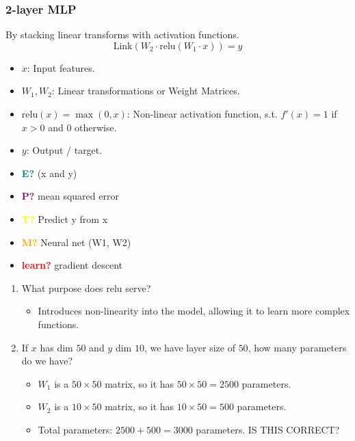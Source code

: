 \documentclass{article}
\begin{document}
\subsubsection{2-layer MLP}
\begin{definition} By stacking linear transforms with activation functions.
    \begin{equation}
        \text{Link}(W_2 \cdot \text{relu}(W_1 \cdot x)) = y
    \end{equation}
    \begin{itemize}
        \item $x$: Input features.
        \item $W_1, W_2$: Linear transformations or Weight Matrices.
        \item $\text{relu}(x) = \max(0,x)$: Non-linear activation function, s.t. $f'(x) = 1$ if $x > 0$ and $0$ otherwise.
        \item $y$: Output / target. 
    \end{itemize}
    \vspace{1em}

    \begin{itemize}
        \item \textcolor{teal}{\textbf{E?}} (x and y)
        \item \textcolor{purple}{\textbf{P?}} mean squared error
        \item \textcolor{yellow}{\textbf{T?}} Predict y from x
        \item \textcolor{orange}{\textbf{M?}} Neural net (W1, W2)
        \item \textcolor{red}{\textbf{learn?}} gradient descent
    \end{itemize}
\end{definition}

\begin{example}
    \begin{enumerate}
        \item What purpose does relu serve? 
            \begin{itemize}
                \item Introduces non-linearity into the model, allowing it to learn more complex functions.
            \end{itemize}       
        \item If $x$ has dim $50$ and $y$ dim $10$, we have layer size of $50$, how many parameters do we have?
            \begin{itemize}
                \item $W_1$ is a $50 \times 50$ matrix, so it has $50 \times 50 = 2500$ parameters.
                \item $W_2$ is a $10 \times 50$ matrix, so it has $10 \times 50 = 500$ parameters.
                \item Total parameters: $2500 + 500 = 3000$ parameters. IS THIS CORRECT?
            \end{itemize} 
    \end{enumerate}
\end{example}
\end{document}
